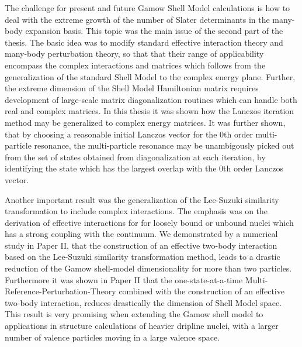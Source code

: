 The challenge for present and future Gamow Shell Model calculations is
how to deal with the extreme growth of the number of Slater determinants
in the many-body expansion basis. This topic was the main issue of the second
part of the thesis. The basic idea was to modify standard effective interaction theory
and many-body perturbation theory, so that that their range of applicability 
encompass the complex interactions and matrices which follows from the 
generalization of the standard Shell Model to the complex energy plane.
Further, the extreme dimension of the Shell Model Hamiltonian matrix
requires development of large-scale matrix diagonalization 
routines which can handle both real and complex matrices. In this
thesis it was shown how the Lanczos iteration method may be generalized
to  complex energy matrices. It was further shown, that by choosing a 
reasonable initial Lanczos vector for the 0th order 
multi-particle resonance, the multi-particle resonance may be 
unambigously picked out from the set of states obtained from
diagonalization at each iteration, by identifying the state which 
has the largest overlap with the 0th order Lanczos vector. 

Another important result was the generalization of the Lee-Suzuki similarity 
transformation to include complex interactions.
The emphasis was on the derivation of effective interactions for 
for loosely bound or unbound nuclei which has a strong coupling with 
the continuum. We demonstrated by a numerical study in Paper II, 
that the construction of an  effective two-body interaction 
based on the Lee-Suzuki similarity transformation method, leads to a drastic
reduction of the Gamow shell-model dimensionality for more than two particles.
Furthermore it was shown in Paper II 
that the one-state-at-a-time Multi-Reference-Perturbation-Theory 
combined with the construction of an effective two-body interaction, 
reduces drastically the dimension of Shell Model space.
This result is very promising 
when extending the Gamow shell model to applications in structure 
calculations of heavier dripline nuclei, 
with a larger number of valence particles moving in a large valence space. 


